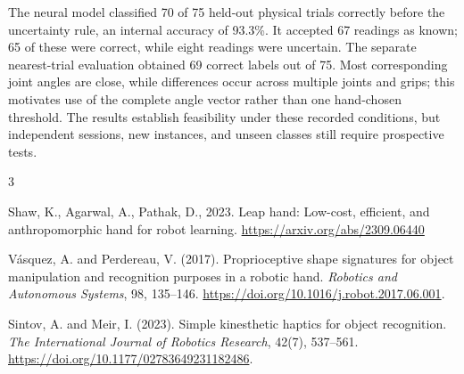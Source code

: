 \documentclass[authoryear,11pt]{elsarticle}
\begin{document}
The neural model classified 70 of 75 held-out physical trials
correctly before the uncertainty rule, an internal accuracy of
93.3\%. It accepted 67 readings as known; 65 of these were correct,
while eight readings were uncertain. The separate nearest-trial
evaluation obtained 69 correct labels out of 75. Most corresponding joint angles are close,
while differences occur across multiple joints and grips; this
motivates use of the complete angle vector rather than one
hand-chosen threshold. The results
establish feasibility under these recorded conditions, but
independent sessions, new instances, and unseen classes still
require prospective tests.

\begin{thebibliography}{3}

Shaw, K., Agarwal, A., Pathak, D., 2023. Leap hand: Low-cost, efficient, and anthropomorphic hand for robot learning.
\url{https://arxiv.org/abs/2309.06440}

V\'{a}squez, A. and Perdereau, V. (2017).
Proprioceptive shape signatures for object manipulation and
recognition purposes in a robotic hand.
\emph{Robotics and Autonomous Systems}, 98, 135--146.
\url{https://doi.org/10.1016/j.robot.2017.06.001}.

Sintov, A. and Meir, I. (2023).
Simple kinesthetic haptics for object recognition.
\emph{The International Journal of Robotics Research}, 42(7), 537--561.
\url{https://doi.org/10.1177/02783649231182486}.

\end{thebibliography}
\end{document}
